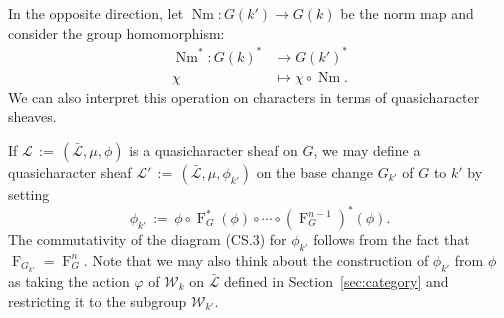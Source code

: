 \documentclass[11pt]{amsart}
\theoremstyle{plain}
\theoremstyle{definition}
\theoremstyle{remark}
\newcommand{\Frob}[1]{\operatorname{F}_{#1}}
\DeclareMathOperator{\Nm}{Nm}
\newcommand{\ceq}{{\, :=\, }}
\newcommand{\qcs}[1]{{\mathcal{#1}}}
\newcommand{\gqcs}[1]{{\mathcal{\bar #1}}}
\newcommand{\Weil}[1]{\mathcal{W}_{#1}}
\begin{document}
In the opposite direction, let $\Nm : G(k') \to G(k)$ be the norm map and consider the group homomorphism:
\begin{align*}
\Nm^* : G(k)^* &\to G(k')^* \\
\chi &\mapsto \chi\circ \Nm.
\end{align*}
We can also interpret this operation on characters in terms of quasicharacter sheaves.

If $\qcs{L} \ceq (\gqcs{L}, \mu, \phi)$ is a quasicharacter sheaf on $G$, we may define
a quasicharacter sheaf $\qcs{L}' \ceq (\gqcs{L}, \mu, \phi_{k'})$ on the base change
$G_{k'}$ of $G$ to $k'$ by setting
\[
\phi_{k'} \ceq \phi \circ \Frob{G}^*(\phi) \circ \cdots \circ (\Frob{G}^{n-1})^*(\phi).
\]
The commutativity of the diagram (CS.3) for $\phi_{k'}$ 
follows from the fact that $\Frob{G_{k'}} = \Frob{G}^n$.
Note that we may also think about the construction of $\phi_{k'}$ from $\phi$
as taking the action $\varphi$ of $\Weil{k}$ on $\gqcs{L}$ 
defined in Section~\ref{sec:category} and restricting it to the subgroup $\Weil{k'}$.
\end{document}
